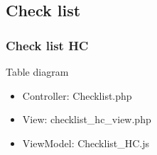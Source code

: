 \documentclass[letterpaper,10pt,english,openany,oneside]{sphinxmanual}
\begin{document}
\subsection{Check list}
\label{\detokenize{module/module:check-list}}

\subsubsection{Check list HC}
\label{\detokenize{module/module:check-list-hc}}
\sphinxAtStartPar
Table diagram

\begin{sphinxVerbatim}[commandchars=\\\{\}]
      
                                            
    
                                            
      
\end{sphinxVerbatim}
\begin{itemize}
\item {} 
\sphinxAtStartPar
Controller: Checklist.php

\item {} 
\sphinxAtStartPar
View: checklist\_hc\_view.php

\item {} 
\sphinxAtStartPar
ViewModel: Checklist\_HC.js

\end{itemize}
\end{document}
